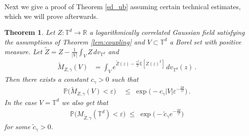 \documentclass[11pt]{article}
\numberwithin{equation}{section}
\newtheorem{theorem}{Theorem}[section]
\theoremstyle{definition}
\renewcommand{\tilde}{\widetilde}          %
\renewcommand{\leq}{\;\leqslant\;}                   %
\newcommand{\R}{\mathbb{R}}
\newcommand{\E}{\mathbb{E}}
\renewcommand{\P}{\mathbb{P}}
\def\eps{\varepsilon}
\def\T{\mathbb{T}}
\newcommand{\ab}{|}
\begin{document}
Next we give a proof of Theorem \ref{sd_ub} assuming certain technical estimates, which we will prove afterwards.


\begin{theorem}
Let $Z: \T^d \to \R$ a logarithmically correlated Gaussian field satisfying the assumptions of Theorem \ref{lem:coupling} and $V \subset \T^d$ a Borel set with positive measure. Let $\tilde Z =  Z - \frac{1}{|V|} \int_V Z \, dv_{\T^d}$ and
\begin{align*}
\tilde M_{Z,\gamma}(V) &= \int_V e^{\tilde Z(z) - \frac{\gamma^2}{2} \E[Z(z)^2]} \, dv_{\T^d}(z)\,.
\end{align*}
Then there exists a constant $c_\gamma > 0$ such that 
\begin{align*}
\P \big( \tilde M_{Z,\gamma}(V) < \eps  \big) & \leq \exp \big( -c_\gamma \ab V \ab   \eps^{- \frac{2d}{\gamma^2}} \big)\,.
\end{align*}
In the case $V = \T^d$ we also get that 
\begin{align*}
\P \big( M_{\tilde Z,\gamma}(\T^d) < \eps \big) \leq \exp \big( - \tilde c_\gamma e^{- \frac{2d}{\gamma^2}} \big) 
\end{align*}
for some $\tilde c_\gamma > 0$. 
\end{theorem}
\end{document}
